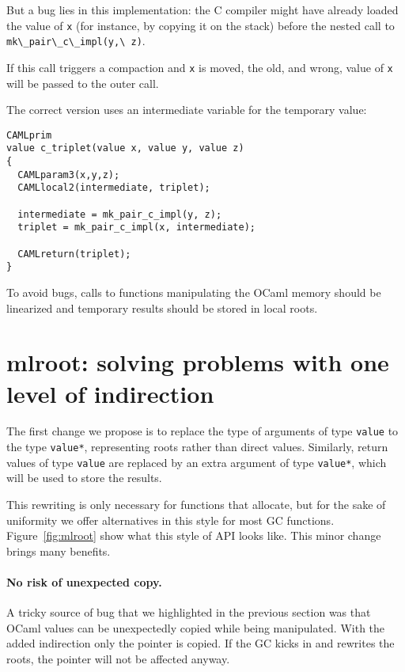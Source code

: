 \documentclass[a4paper]{easychair}
\newcommand{\cpp}[1]{\lstinline[style=C++]{#1}}
\begin{document}
But a bug lies in this implementation: the C compiler might have already
loaded the value of \cpp{x} (for instance, by copying it on the
stack) before the nested call to \cpp{mk\_pair\_c\_impl(y,\ z)}.

If this call triggers a compaction and \cpp{x} is moved, the old,
and wrong, value of \cpp{x} will be passed to the outer call.

The correct version uses an intermediate variable for the temporary
value:
%
\begin{lstlisting}[style=C++]
CAMLprim
value c_triplet(value x, value y, value z)
{
  CAMLparam3(x,y,z);
  CAMLlocal2(intermediate, triplet);

  intermediate = mk_pair_c_impl(y, z);
  triplet = mk_pair_c_impl(x, intermediate);

  CAMLreturn(triplet);
}
\end{lstlisting}

To avoid bugs, calls to functions manipulating the OCaml memory should be
linearized and temporary results should be stored in local roots.

\section{mlroot: solving problems with one level of indirection}

The first change we propose is to replace the type of arguments of type \cpp{value}
to the type \cpp{value*}, representing roots rather than direct values.
Similarly, return values of type \cpp{value} are replaced by an extra argument
of type \cpp{value*}, which will be used to store the results.

This rewriting is only necessary for functions that allocate, but for the sake
of uniformity we offer alternatives in this style for most GC functions.
Figure~\ref{fig:mlroot} show what this style of API looks like.
This minor change brings many benefits.

\paragraph{No risk of unexpected copy.}

A tricky source of bug that we highlighted in the previous section was
that OCaml values can be unexpectedly copied while being manipulated. With
the added indirection only the pointer is copied. If the GC kicks in and
rewrites the roots, the pointer will not be affected anyway.
\end{document}

